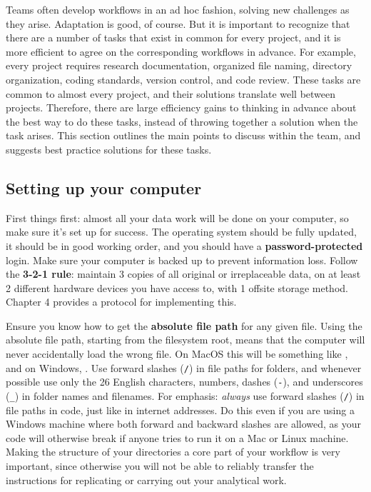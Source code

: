 Teams often develop workflows in an ad hoc fashion,
solving new challenges as they arise.
Adaptation is good, of course.
But it is important to recognize
that there are a number of tasks that exist in common for every project,
and it is more efficient to agree on the corresponding workflows in advance.
For example, every project requires
research documentation, organized file naming, directory organization,
coding standards, version control, and code review.
These tasks are common to almost every project,
and their solutions translate well between projects.
Therefore, there are large efficiency gains to
thinking in advance about the best way to do these tasks,
instead of throwing together a solution when the task arises.
This section outlines the main points to discuss within the team,
and suggests best practice solutions for these tasks.

\subsection{Setting up your computer}

First things first:
almost all your data work will be done on your computer,
so make sure it's set up for success.
The operating system should be fully updated,
it should be in good working order,
and you should have a \textbf{password-protected} login.
Make sure your computer is backed up to prevent information loss.
Follow the \textbf{3-2-1 rule}: maintain 3 copies of all original or irreplaceable data,
on at least 2 different hardware devices you have access to,
with 1 offsite storage method.
Chapter 4 provides a protocol for implementing this.

Ensure you know how to get the \textbf{absolute file path} for any given file.
Using the absolute file path, starting from the filesystem root,
means that the computer will never accidentally load the wrong file.
On MacOS this will be something like ,
and on Windows, .
Use forward slashes (\texttt{/}) in file paths for folders,
and whenever possible use only the 26 English characters, numbers,
dashes (\texttt{-}), and underscores (\texttt{\_}) in folder names and filenames.
For emphasis: \textit{always} use forward slashes (\texttt{/})
in file paths in code, just like in internet addresses.
Do this even if you are using a Windows machine where
both forward and backward slashes are allowed,
as your code will otherwise break
if anyone tries to run it on a Mac or Linux machine.
Making the structure of your directories a core part of your workflow is very important,
since otherwise you will not be able to reliably transfer the instructions
for replicating or carrying out your analytical work.

